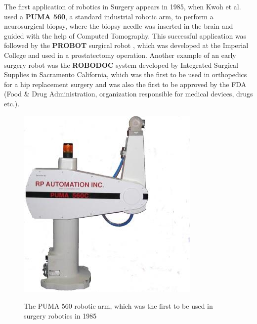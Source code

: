 The first application of robotics in Surgery appears in 1985, when Kwoh et al. \cite{Shao1985ANC} used a \textbf{PUMA 560}, a standard industrial robotic arm, to perform a neurosurgical biopsy, 
where the biopsy needle was inserted in the brain and guided with the help of Computed Tomography. This successful application was followed by the \textbf{PROBOT} surgical robot \cite{Probot1992}, 
which was developed at the Imperial College and used in a prostatectomy operation. Another example of an early surgery robot was the \textbf{ROBODOC} system \cite{Robodoc} developed by Integrated Surgical Supplies 
in Sacramento California, which was the first to be used in orthopedics for a hip replacement surgery and was also the first to be approved by the FDA (Food \& Drug Administration, organization responsible 
for medical devices, drugs etc.).

\begin{center}
\begin{figure}[H]
\centering
\includegraphics{images/Puma560.jpg}\\
\caption{The PUMA 560 robotic arm, which was the first to be used in surgery robotics in 1985}
\end{figure}
\end{center}

